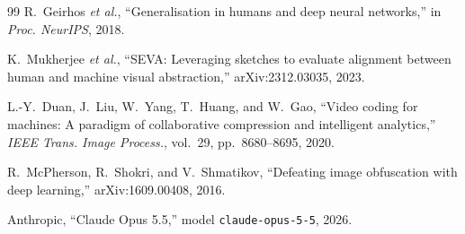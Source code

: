 \documentclass[conference]{IEEEtran}
\begin{document}
\begin{thebibliography}{99}
 R.~Geirhos \emph{et al.}, ``Generalisation in humans and deep neural networks,'' in \emph{Proc. NeurIPS}, 2018.

 K.~Mukherjee \emph{et al.}, ``SEVA: Leveraging sketches to evaluate alignment between human and machine visual abstraction,'' arXiv:2312.03035, 2023.

 L.-Y.~Duan, J.~Liu, W.~Yang, T.~Huang, and W.~Gao, ``Video coding for machines: A paradigm of collaborative compression and intelligent analytics,'' \emph{IEEE Trans. Image Process.}, vol.~29, pp.~8680--8695, 2020.

 R.~McPherson, R.~Shokri, and V.~Shmatikov, ``Defeating image obfuscation with deep learning,'' arXiv:1609.00408, 2016.

 Anthropic, ``Claude Opus 5.5,'' model \texttt{claude-opus-5-5}, 2026.

\end{thebibliography}
\end{document}
